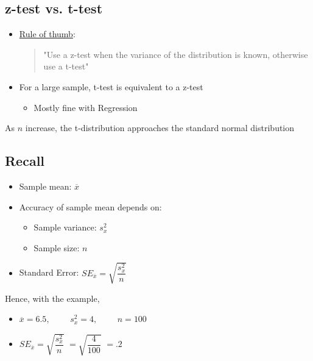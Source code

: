 \documentclass[10pt,article]{article}
\begin{document}
\subsection{z-test vs. t-test}
\label{sec:org2f1f6d0}
\begin{itemize}
\item \uline{Rule of thumb}: 
\begin{quote}
"Use a z-test when the variance of the distribution is known, otherwise use
a t-test"
\end{quote}

\item For a large sample, t-test is equivalent to a z-test

\begin{itemize}
\item Mostly fine with Regression
\end{itemize}
\end{itemize}

As \(n\) increase, the t-distribution approaches the standard normal
distribution
\subsection{Recall}
\label{sec:orgd499fc3}
\begin{itemize}
\item Sample mean: \(\overline{x}\)

\item Accuracy of sample mean depends on:
\begin{itemize}
\item Sample variance: \(s_x^2\)
\item Sample size: \(n\)
\end{itemize}

\item Standard Error: \(SE_{\overline{x}} = \sqrt{\dfrac{s^2_x}{n}}\)
\end{itemize}

Hence, with the example,

\begin{itemize}
\item \(\overline{x} = 6.5, \qquad\)  \( s_x^2 = 4, \qquad\)  \( n = 100 \)
\item \(SE_{\overline{x}} = \sqrt{\dfrac{s^2_x}{n}}\)  \( = \sqrt{\dfrac{4}{100}} \)  \( = .2 \)
\end{itemize}
\end{document}
